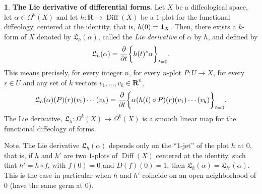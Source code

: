 \documentclass[11pt,reqno]{amsart}
\theoremstyle{definition}
\newtheorem{article}{}
\newcommand{\artlabel}[1]{{\bf #1.}}
\renewcommand{\over}{\above .2pt}
\newcommand{\RR}{{\mathbf R}}
\def \D{{D}}
\def \P{{P}}
\def \U{{U}}
\def \X{{X}}
\newcommand{\fL}{{\mathfrak  L}}
\newcommand{\Diff}{\operatorname{Diff}}
\newcommand{\DLie}{{\fL}}
\newcommand{\id}{{\bf 1}}
\begin{document}
  \begin{article}\artlabel{The Lie derivative of differential forms}
    \label{The-Lie-derivative-of-differential-forms}
    Let $\X$ be a diffeological space, let $\alpha \in
      \Omega^k(\X)$ and let $h: \RR \to \Diff(\X)$ be a $1$-plot
    for the functional diffeology, centered at the identity, that is,
    $h(0) = \id_\X$. Then, there exists a $k$-form of $\X$
    denoted by $\DLie_h(\alpha)$, called the {\em Lie
    derivative} of $\alpha$ by $h$, and defined by
    $$\DLie_h(\alpha) = {\partial \over \partial t}
      \bigg\{ h(t)^* \alpha \bigg\}_{t = 0}.
    $$ 
    This means precisely, for every integer $n$, for every
    $n$-plot $\P: \U \to \X$, for every $r \in \U$ and
    any set of $k$ vectors $v_1,\ldots,v_k \in \RR^n$, 
    $$
      \DLie_h(\alpha)(\P)(r)(v_1)\cdots(v_k) = {\partial
      \over \partial t}\bigg\{\alpha(h(t) \circ
      \P)(r)(v_1)\cdots(v_k)\bigg\}_{t = 0}.
      $$ 
    The Lie derivative, 
    $\DLie_h: \Omega^k(\X) \to \Omega^k(\X)$ is a 
    smooth linear map for the functional diffeology of forms.
    
    {\sc Note.} The Lie derivative $\DLie_h(\alpha)$
    depends only on the ``$1$-jet'' of the plot $h$ at $0$, that is,
    if $h$ and $h'$ are two $1$-plots of
    $\Diff(\X)$ centered at the identity, such that $h' = h
      \circ f$, with $f(0) = 0$ and $\D(f)(0) = 1$, then
    $\DLie_h(\alpha) =  \DLie_{h'}(\alpha)$. This is the
    case in particular when $h$ and $h'$ coincide on an open
    neighborhood of $0$ (have the same germ at $0$).
  \end{article} %
  
\end{document}
